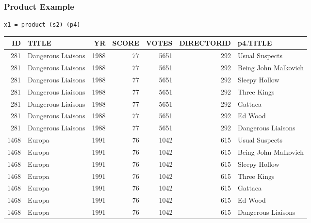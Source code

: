 \documentclass[dvipsnames]{beamer}
\theoremstyle{plain}
\begin{document}
\begin{frame}[fragile]
  \frametitle{Product Example}

  \begin{example}
    \begin{lstlisting}
x1 = product (s2) (p4)
    \end{lstlisting}

    \pause
    \begin{tiny}
    \begin{table}
      \begin{tabular}{|r|l|r|r|r|r|l|}\hline
  ID & TITLE              &   YR & SCORE & VOTES & DIRECTORID & p4.TITLE            \\\hline\hline
 281 & Dangerous Liaisons & 1988 &    77 &  5651 &        292 & Usual Suspects      \\\hline
 281 & Dangerous Liaisons & 1988 &    77 &  5651 &        292 & Being John Malkovich\\\hline
 281 & Dangerous Liaisons & 1988 &    77 &  5651 &        292 & Sleepy Hollow       \\\hline
 281 & Dangerous Liaisons & 1988 &    77 &  5651 &        292 & Three Kings         \\\hline
 281 & Dangerous Liaisons & 1988 &    77 &  5651 &        292 & Gattaca             \\\hline
 281 & Dangerous Liaisons & 1988 &    77 &  5651 &        292 & Ed Wood             \\\hline
 281 & Dangerous Liaisons & 1988 &    77 &  5651 &        292 & Dangerous Liaisons  \\\hline
1468 & Europa             & 1991 &    76 &  1042 &        615 & Usual Suspects      \\\hline
1468 & Europa             & 1991 &    76 &  1042 &        615 & Being John Malkovich\\\hline
1468 & Europa             & 1991 &    76 &  1042 &        615 & Sleepy Hollow       \\\hline
1468 & Europa             & 1991 &    76 &  1042 &        615 & Three Kings         \\\hline
1468 & Europa             & 1991 &    76 &  1042 &        615 & Gattaca             \\\hline
1468 & Europa             & 1991 &    76 &  1042 &        615 & Ed Wood             \\\hline
1468 & Europa             & 1991 &    76 &  1042 &        615 & Dangerous Liaisons  \\\hline
      \end{tabular}
    \end{table}
    \end{tiny}
  \end{example}
\end{frame}
\end{document}
